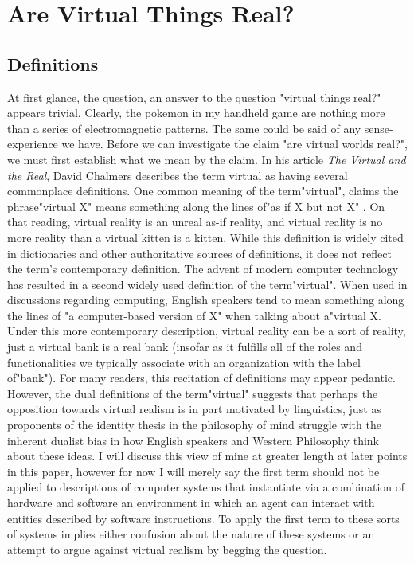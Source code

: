 \chapter{Are Virtual Things Real?}
\section{Definitions}
At first glance, the question, an answer to the question "virtual things real?" appears trivial. Clearly, the pokemon in my handheld game are nothing more than a series of electromagnetic patterns. The same could be said of any sense-experience we have. 
Before we can investigate the claim "are virtual worlds real?", we must first establish what we mean by the claim. In his article \textit{The Virtual and the Real}, David Chalmers describes the term virtual as having several commonplace definitions. One common meaning of the term"virtual", claims the phrase"virtual X" means something along the lines of"as if X but not X" . On that reading, virtual reality is an unreal as-if reality, and virtual reality is no more reality than a virtual kitten is a kitten. \cite{ChalmersVR} While this definition is widely cited in dictionaries and other authoritative sources of definitions, it does not reflect the term’s contemporary definition. The advent of modern computer technology has resulted in a second widely used definition of the term"virtual". When used in discussions regarding computing, English speakers  tend to mean something along the lines of "a computer-based version of X" when talking about a"virtual X. Under this more contemporary description, virtual reality can be a sort of reality, just a virtual bank is a real bank (insofar as it fulfills all of the roles and functionalities we typically associate with an organization with the label of"bank"). 
For many readers, this recitation of definitions may appear pedantic. However, the dual definitions of the term"virtual" suggests that perhaps the opposition towards virtual realism is in part motivated by linguistics, just as proponents of the identity thesis in the philosophy of mind struggle with the inherent dualist bias in how English speakers and Western Philosophy think about these ideas. I will discuss this view of mine at greater length at later points in this paper, however for now I will merely say the first term should not be applied to descriptions of computer systems that instantiate via a combination of hardware and software an environment in which an agent can interact with entities described by software instructions. To apply the first term to these sorts of systems implies either confusion about the nature of these systems or an attempt to argue against virtual realism by begging the question. 
